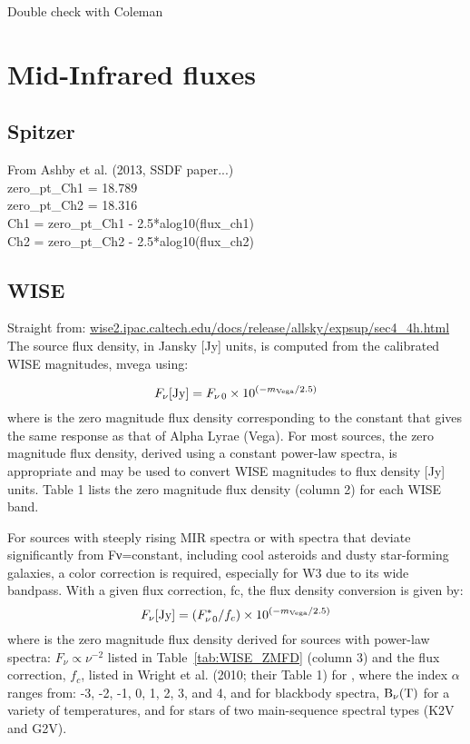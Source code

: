 \documentclass[11pt,a4paper]{article}
\begin{document}
Double check with Coleman


\section{Mid-Infrared fluxes}

\subsection{Spitzer}
 From Ashby et al. (2013, SSDF paper...) \\
zero\_pt\_Ch1 = 18.789\\
zero\_pt\_Ch2 = 18.316\\

\noindent
Ch1  = zero\_pt\_Ch1 - 2.5*alog10(flux\_ch1) \\
Ch2  = zero\_pt\_Ch2 - 2.5*alog10(flux\_ch2) \\


\subsection{WISE}
Straight from: \href{http://wise2.ipac.caltech.edu/docs/release/allsky/expsup/sec4\_4h.html}{wise2.ipac.caltech.edu/docs/release/allsky/expsup/sec4\_4h.html} \\
The source flux density, in Jansky [Jy] units, is computed from the calibrated WISE magnitudes, mvega using: 

\begin{equation}
  F_{\nu}[{\rm Jy}] = F_{\nu\,0} \times 10^{({-m_{\rm Vega}/2.5})}
\end{equation}
 where is the zero magnitude flux density corresponding to the constant that gives the same response as that of Alpha Lyrae (Vega). For most sources, the zero magnitude flux density, derived using a constant power-law spectra, is appropriate and may be used to convert WISE magnitudes to flux density [Jy] units. Table 1 lists the zero magnitude flux density (column 2) for each WISE band.

For sources with steeply rising MIR spectra or with spectra that deviate significantly from Fν=constant, including cool asteroids and dusty star-forming galaxies, a color correction is required, especially for W3 due to its wide bandpass. With a given flux correction, fc, the flux density conversion is given by:
\begin{equation}
F_{\nu}[{\rm Jy}] = (F^{*}_{\nu\,0}/f_{c}) \times 10^{({-m_{\rm Vega}/2.5})}
\end{equation}
where is the zero magnitude flux density derived for sources with
power-law spectra: $F_{\nu} \propto \nu^{-2}$ listed in
Table~\ref{tab:WISE_ZMFD} (column 3) and the flux correction, $f_{c}$,
listed in Wright et al. (2010; their Table 1) for , where the index
$\alpha$ ranges from: -3, -2, -1, 0, 1, 2, 3, and 4, and for blackbody
spectra, $\rm{B}_{\nu}(T)$ for a variety of temperatures, and for stars of two
main-sequence spectral types (K2V and G2V).
\end{document}
